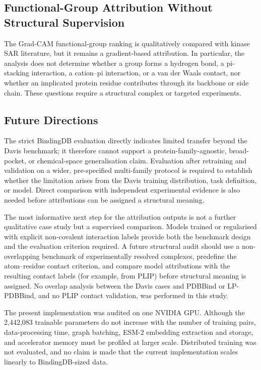 \documentclass[fleqn,10pt]{wlscirep}
\begin{document}
\subsection{Functional-Group Attribution Without Structural Supervision}

The Grad-CAM functional-group ranking is qualitatively compared with kinase
SAR literature, but it remains a gradient-based attribution.  In particular,
the analysis does not determine whether a group forms a hydrogen bond, a
pi-stacking interaction, a cation--pi interaction, or a van der Waals contact,
nor whether an implicated protein residue contributes through its backbone or
side chain.  These questions require a structural complex or targeted
experiments.\cite{zhang2009targeting}

\subsection{Future Directions}

The strict BindingDB evaluation directly indicates limited transfer beyond the
Davis benchmark; it therefore cannot support a protein-family-agnostic,
broad-pocket, or chemical-space generalisation claim.  Evaluation after
retraining and validation on a wider, pre-specified multi-family protocol is
required to establish whether the limitation arises from the Davis training
distribution, task definition, or model. Direct comparison with independent
experimental evidence is also needed before attributions can be assigned a
structural meaning.

The most informative next step for the attribution outputs is not a further
qualitative case study but a supervised comparison.  Models trained or
regularised with explicit non-covalent interaction labels provide both the
benchmark design and the evaluation criterion
required.\cite{li2020monn,gim2023arkdta,seo2024blendnet}  A future structural
audit should use a non-overlapping benchmark of experimentally resolved
complexes, predefine the atom--residue contact criterion, and compare model
attributions with the resulting contact labels (for example, from
PLIP\cite{salentin2015plip}) before structural meaning is assigned.  No overlap
analysis between the Davis cases and PDBBind or LP-PDBBind, and no PLIP contact
validation, was performed in this study.

The present implementation was audited on one NVIDIA GPU. Although the
2{,}442{,}083 trainable parameters do not increase with the number of training
pairs, data-processing time, graph batching, ESM-2 embedding extraction and
storage, and accelerator memory must be profiled at larger scale. Distributed
training was not evaluated, and no claim is made that the current implementation
scales linearly to BindingDB-sized data.
\end{document}
